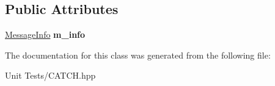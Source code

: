 \subsection*{Public Attributes}
\begin{DoxyCompactItemize}
\item 
\hyperlink{structCatch_1_1MessageInfo}{Message\+Info} {\bfseries m\+\_\+info}\hypertarget{classCatch_1_1ScopedMessage_ae6e1476f389cc6e1586f033b3747b27b}{}\label{classCatch_1_1ScopedMessage_ae6e1476f389cc6e1586f033b3747b27b}

\end{DoxyCompactItemize}


The documentation for this class was generated from the following file\+:\begin{DoxyCompactItemize}
\item 
Unit Tests/C\+A\+T\+C\+H.\+hpp\end{DoxyCompactItemize}
